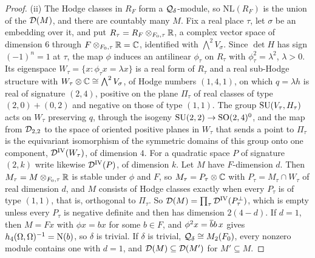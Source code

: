 \begin{proof}
(ii) The Hodge classes in $R_{F}$ form a $\mathcal{Q}_{\delta}$-module, so
$\mathrm{NL}(R_{F})$ is the union of the $\mathcal{D}(M)$, and there are countably
many $M$. Fix a real place $\tau$, let $\sigma$ be an embedding over it, and
put $R_{\tau}=R_{F}\otimes_{F_{0},\tau}\mathbb{R}$, a complex vector space of
dimension $6$ through $F\otimes_{F_{0},\tau}\mathbb{R}=\mathbb{C}$, identified with
$\bigwedge^{2}V_{\sigma}$. Since $\det H$ has sign $(-1)^{n}=1$ at $\tau$, the
map $\phi$ induces an antilinear $\phi_{\tau}$ on $R_{\tau}$ with
$\phi_{\tau}^{2}=\lambda^{2}$, $\lambda>0$. Its eigenspace
$W_{\tau}=\{x:\phi_{\tau}x=\lambda x\}$ is a real form of $R_{\tau}$ and a real
sub-Hodge structure with $W_{\tau}\otimes\mathbb{C}\cong\bigwedge^{2}V_{\sigma}$, of
Hodge numbers $(1,4,1)$, on which $q=\lambda h$ is real of signature $(2,4)$,
positive on the plane $\Pi_{\tau}$ of real classes of type $(2,0)+(0,2)$ and
negative on those of type $(1,1)$. The group $\operatorname{SU}(V_{\tau},H_{\tau})$ acts on
$W_{\tau}$ preserving $q$, through the isogeny $\operatorname{SU}(2,2)\to\mathrm{SO}(2,4)^{0}$,
and the map from $\mathcal{D}_{2,2}$ to the space of oriented positive planes in
$W_{\tau}$ that sends a point to $\Pi_{\tau}$ is the equivariant isomorphism of
the symmetric domains of this group onto one component,
$\mathcal{D}^{\mathrm{IV}}(W_{\tau})$, of dimension $4$. For a quadratic space $P$ of
signature $(2,k)$ write likewise $\mathcal{D}^{\mathrm{IV}}(P)$, of dimension $k$. Let
$M$ have $F$-dimension $d$. Then $M_{\tau}=M\otimes_{F_{0},\tau}\mathbb{R}$ is stable
under $\phi$ and $F$, so $M_{\tau}=P_{\tau}\otimes\mathbb{C}$ with
$P_{\tau}=M_{\tau}\cap W_{\tau}$ of real dimension $d$, and $M$ consists of
Hodge classes exactly when every $P_{\tau}$ is of type $(1,1)$, that is,
orthogonal to $\Pi_{\tau}$. So
$\mathcal{D}(M)=\prod_{\tau}\mathcal{D}^{\mathrm{IV}}(P_{\tau}^{\perp})$, which is empty unless
every $P_{\tau}$ is negative definite and then has dimension $2(4-d)$. If
$d=1$, then $M=Fx$ with $\phi x=bx$ for some $b\in F$, and
$\phi^{2}x=\overline{b}b\,x$ gives $h_{4}(\Omega,\Omega)^{-1}=\mathrm{N}(b)$, so $\delta$ is
trivial. If $\delta$ is trivial, $\mathcal{Q}_{\delta}\cong M_{2}(F_{0})$, every nonzero
module contains one with $d=1$, and $\mathcal{D}(M)\subseteq\mathcal{D}(M')$ for
$M'\subseteq M$.


\end{proof}
